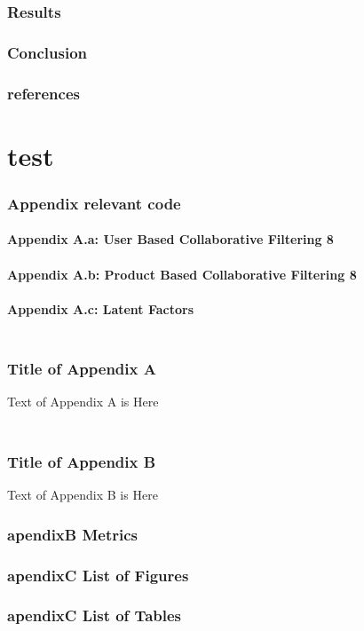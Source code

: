 \documentclass{article}
\begin{document}
\section{Results}
\section{Conclusion}
\section{references}

\appendix
\part{test}
\section{Appendix relevant code}
\subsection{Appendix A.a: User Based Collaborative Filtering	8}
\subsection{Appendix A.b: Product Based Collaborative Filtering	8}
\subsection{Appendix A.c: Latent Factors}
\section{\\Title of Appendix A}

Text of Appendix A is Here

\section{\\Title of Appendix B}

Text of Appendix B is Here

\section{apendixB Metrics}
\section{apendixC List of Figures}
\listoffigures
 

\section{apendixC List of Tables}
\listoftables
\newpage


\end{document}
